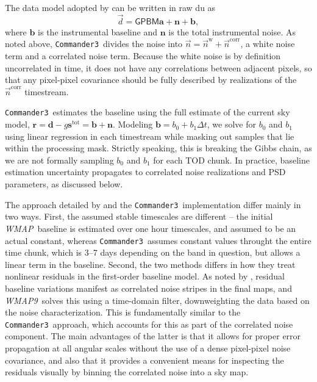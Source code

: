 \documentclass[twocolumn]{../../common/aa}
\def\WMAP{\emph{WMAP}}
\def\WMAPnine{\emph{WMAP9}}
\def\commanderthree{\texttt{Commander3}}
\newcommand{\n}[0]{\vec{n}}
\newcommand{\data}{\vec d}
\begin{document}
The data model adopted by \citet{hinshaw2003a} can be written in raw du as
\begin{equation}
	\data = \mathsf{GPBM}\boldsymbol a+\boldsymbol n+\boldsymbol b,
\end{equation}
where $\boldsymbol b$ is the instrumental baseline and $\boldsymbol n$ is the
total instrumental noise. As noted above, \commanderthree\ divides
the noise into $\n=\n^\mathrm w+\n^\mathrm{corr}$, a white noise term and a
correlated noise term. Because the white noise is by definition uncorrelated in time, it does not have any
correlations between adjacent pixels, so that any pixel-pixel covariance should
be fully described by realizations of the $\n^\mathrm{corr}$ timestream.

\commanderthree\ estimates the baseline using the full estimate of the current sky
model, $\boldsymbol r=\boldsymbol d-g\boldsymbol s^\mathrm{tot}=\boldsymbol
b+\boldsymbol n$. Modeling $\boldsymbol b=b_0+b_1\Delta t$, we solve for $b_0$
and $b_1$ using linear regression in each timestream while masking out samples
that lie within the processing mask. Strictly speaking, this is breaking the
Gibbs chain, as we are not formally sampling $b_0$ and $b_1$ for each TOD
chunk. In practice, baseline estimation uncertainty propagates to correlated
noise realizations and PSD parameters, as discussed below.

The approach detailed by \citet{hinshaw2003a} and the
\commanderthree\ implementation differ mainly in two ways. First, the
assumed stable timescales are different -- the initial
\WMAP\ baseline is estimated over one hour timescales, and assumed to
be an actual constant, whereas \commanderthree\ assumes constant values
throught the entire time chunk, which is 3--7 days depending on the
band in question, but allows a linear term in the baseline. Second,
the two methods differs in how they treat nonlinear residuals in the
first-order baseline model.  As noted by \citet{hinshaw2003a},
residual baseline variations manifest as correlated noise stripes in
the final maps, and \WMAPnine\ solves this using a time-domain filter,
downweighting the data based on the noise characterization. This
is fundamentally similar to the \commanderthree\ approach, which
accounts for this as part of the correlated noise component. The main
advantages of the latter is that it allows for proper error
propagation at all angular scales without the use of a dense
pixel-pixel noise covariance, and also that it provides a convenient
means for inspecting the residuals visually by binning the correlated
noise into a sky map.
\end{document}
